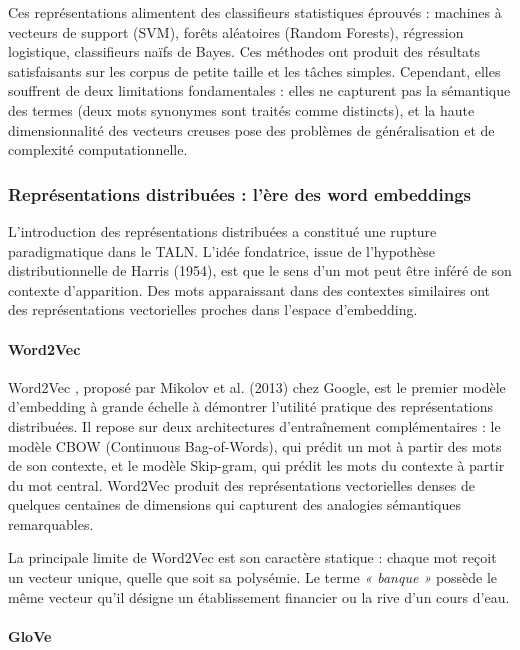 Ces représentations alimentent des classifieurs statistiques éprouvés : machines à vecteurs de support (SVM), forêts aléatoires (Random Forests), régression logistique, classifieurs naïfs de Bayes. Ces méthodes ont produit des résultats satisfaisants sur les corpus de petite taille et les tâches simples. Cependant, elles souffrent de deux limitations fondamentales : elles ne capturent pas la sémantique des termes (deux mots synonymes sont traités comme distincts), et la haute dimensionnalité des vecteurs creuses pose des problèmes de généralisation et de complexité computationnelle.

\subsubsection{Représentations distribuées : l'ère des word embeddings}

L'introduction des représentations distribuées a constitué une rupture paradigmatique dans le TALN. L'idée fondatrice, issue de l'hypothèse distributionnelle de Harris (1954), est que le sens d'un mot peut être inféré de son contexte d'apparition. Des mots apparaissant dans des contextes similaires ont des représentations vectorielles proches dans l'espace d'embedding.

\paragraph{Word2Vec}

Word2Vec \cite{logo:word2vec}, proposé par Mikolov et al. (2013) chez Google, est le premier modèle d'embedding à grande échelle à démontrer l'utilité pratique des représentations distribuées. Il repose sur deux architectures d'entraînement complémentaires : le modèle CBOW (Continuous Bag-of-Words), qui prédit un mot à partir des mots de son contexte, et le modèle Skip-gram, qui prédit les mots du contexte à partir du mot central. Word2Vec produit des représentations vectorielles denses de quelques centaines de dimensions qui capturent des analogies sémantiques remarquables.

La principale limite de Word2Vec est son caractère statique : chaque mot reçoit un vecteur unique, quelle que soit sa polysémie. Le terme \textit{« banque »} possède le même vecteur qu'il désigne un établissement financier ou la rive d'un cours d'eau.

\paragraph{GloVe}

